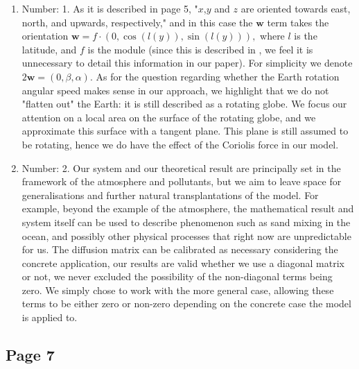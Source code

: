 \documentclass[11pt]{article}
\begin{document}
\begin{enumerate}
  \item Number: 1. As it is described in page 5, "$x$,$y$ and $z$ are oriented towards east, north, and upwards, respectively," and in this case the $\mathbf{w}$ term takes the orientation $\mathbf{w} = f \cdot (0, \cos(l(y)), \sin(l(y))),$ where $l$ is the latitude, and $f$ is the module (since this is described in \cite{azerad2001mathematical}, we feel it is unnecessary to detail this information in our paper). For simplicity we denote $2 \mathbf{w} = (0, \beta, \alpha).$ As for the question regarding whether the Earth rotation angular speed makes sense in our approach, we highlight that we do not "flatten out" the Earth: it is still described as a rotating globe. We focus our attention on a local area on the surface of the rotating globe, and we approximate this surface with a tangent plane. This plane is still assumed to be rotating, hence we do have the effect of the Coriolis force in our model.
  \item Number: 2. Our system and our theoretical result are principally set in the framework of the atmosphere and pollutants, but we aim to leave space for generalisations and further natural transplantations of the model. For example, beyond the example of the atmosphere, the mathematical result and system itself can be used to describe phenomenon such as sand mixing in the ocean, and possibly other physical processes that right now are unpredictable for us. The diffusion matrix can be calibrated as necessary considering the concrete application, our results are valid whether we use a diagonal matrix or not, we never excluded the possibility of the non-diagonal terms being zero. We simply chose to work with the more general case, allowing these terms to be either zero or non-zero depending on the concrete case the model is applied to.
\end{enumerate}

\subsection{Page 7}
\end{document}
